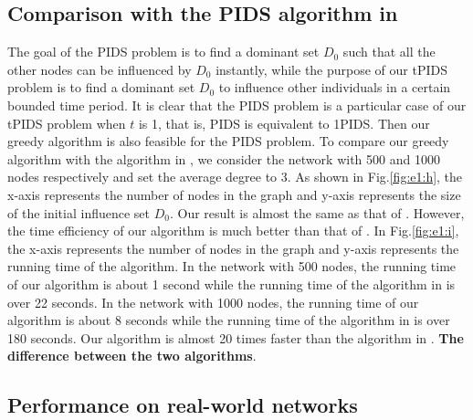 \subsection{Comparison with the PIDS algorithm in \cite{WDC2011}}
The goal of the PIDS problem is to find a dominant set $D_0$ such that all the other nodes can be 
influenced by $D_0$ instantly, while the purpose of our tPIDS problem is to find a dominant set $D_0$ to
influence other individuals in a certain bounded time period. 
It is clear that the PIDS problem is a particular case of our tPIDS problem when $t$ is 1, that is, PIDS is equivalent to 1PIDS.
Then our greedy algorithm is also feasible for the PIDS problem. 
To compare our greedy algorithm with the algorithm in \cite{WDC2011}, we consider the network with 500
and 1000 nodes respectively and set the average degree to 3. As shown in Fig.\ref{fig:e1:h},
the x-axis represents the number of nodes in the graph and y-axis represents the size of the 
initial influence set $D_0$. Our result is almost the same as that of \cite{WDC2011}. 
However, the time efficiency of our algorithm is much better than that of \cite{WDC2011}. 
In Fig.\ref{fig:e1:i}, the x-axis represents the number of nodes in the graph and y-axis represents the running time
of the algorithm. In the network with 500 nodes, the running time of our algorithm is about 1 second 
while the running time of the algorithm in \cite{WDC2011} is over 22 seconds. 
In the network with 1000 nodes, the running time of our algorithm is about 8 seconds while the running time of the algorithm in \cite{WDC2011} is over 180 seconds. Our algorithm is almost 20 times faster than the algorithm in \cite{WDC2011}.
\textbf{The difference between the two algorithms}.

\subsection{Performance on real-world networks}

